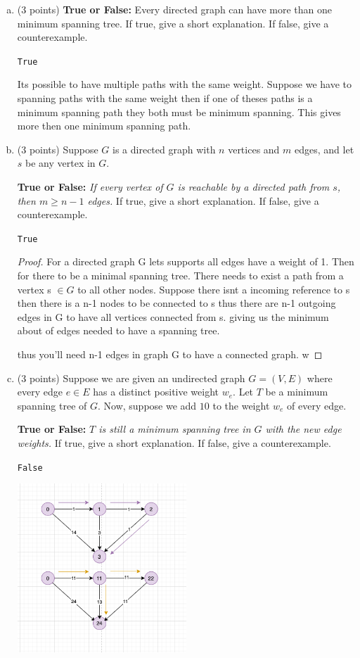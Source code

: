 \documentclass[12pt]{amsart}
\newcommand\TT[1]{\texttt{#1}}
\begin{document}
\begin{enumerate}[(a)]


\item (3 points) {\bf True or False:} Every directed graph can have more than one minimum spanning tree. If true, give a short explanation.
If false, give a counterexample.

\TT{True} 

Its possible to have multiple paths with the same weight. Suppose we have to spanning paths with the same weight then if one of theses paths is a minimum spanning path they both must be minimum spanning. This gives more then one minimum spanning path.

\vfill

\item (3 points) Suppose $G$ is a directed graph with $n$ vertices and $m$ edges, and let $s$ be any vertex in $G$.   

{\bf True or False:} \emph{If every vertex of $G$ is reachable by a directed path from $s$, then $m \ge n-1$ edges.}
If true, give a short explanation.
If false, give a counterexample.

\TT{True} 

\begin{proof}
For a directed graph G lets supports all edges have a weight of 1. Then for there to be a minimal spanning tree. There needs to exist a path from a vertex s $\in G$ to all other nodes. Suppose there isnt a incoming reference to s then there is a n-1 nodes to be connected to s thus there are n-1 outgoing edges in G to have all vertices connected from s. giving us the minimum about of edges needed to have a spanning tree. 

thus you'll need n-1 edges in graph G to have a connected graph. w
\end{proof}

\vfill


\item (3 points) Suppose we are given an undirected graph $G=(V,E)$ where every edge $e\in E$ has a distinct positive weight $w_e$.  Let $T$ be a minimum spanning tree of $G$.
Now, suppose we add $10$ to the weight $w_e$ of every edge.

{\bf True or False:} \emph{$T$ is still a minimum spanning tree in $G$ with the new edge weights.}
If true, give a short explanation.
If false, give a counterexample.

\TT{False}


 \begin{center}
\includegraphics[width=0.5\textwidth]{QQ2.png}
\end{center}


\end{enumerate}
\end{document}
